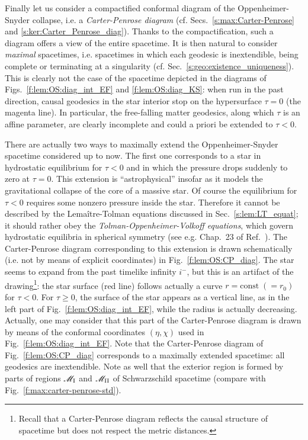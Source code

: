 Finally let us consider a compactified conformal diagram of the Oppenheimer-Snyder collapse, i.e.
a \emph{Carter-Penrose diagram}
(cf. Secs.~\ref{s:max:Carter-Penrose} and \ref{s:ker:Carter_Penrose_diag}).
Thanks to the compactification, such a diagram offers a view of the entire spacetime.
It is then natural to consider \emph{maximal} spacetimes,
i.e. spacetimes in which each geodesic is inextendible, being complete or terminating
at a singularity (cf. Sec.~\ref{s:geo:existence_uniqueness}).
This is clearly not the case of the spacetime depicted in the
diagrams of
Figs.~\ref{f:lem:OS:diag_int_EF} and \ref{f:lem:OS:diag_KS}: when run
in the past direction, causal geodesics
in the star interior stop on the hypersurface $\tau=0$
(the magenta line). In particular, the free-falling matter geodesics, along
which $\tau$ is an affine parameter, are clearly incomplete and could a priori
be extended to
$\tau < 0$.

There are actually two ways to maximally extend the Oppenheimer-Snyder spacetime
considered up to now.
The first one corresponds to a star in
hydrostatic equilibrium for $\tau < 0$ and in which the pressure drops suddenly to zero at $\tau = 0$.
This extension is ``astrophysical'' insofar as it models the gravitational collapse of the core of a massive star. Of course the equilibrium for $\tau< 0$ requires
some nonzero pressure inside the star. Therefore it cannot be described by the
Lemaître-Tolman equations discussed in Sec.~\ref{s:lem:LT_equat}; it should rather
obey the \emph{Tolman-Oppenheimer-Volkoff equations},
which govern hydrostatic equilibria in
spherical symmetry (see e.g. Chap.~23 of Ref.~\cite{MisneTW73}).
The Carter-Penrose diagram corresponding to this extension
is drawn schematically (i.e. not by means of explicit coordinates) in Fig.~\ref{f:lem:OS:CP_diag}. The star seems to expand from
the past timelike infinity $i^-$, but this is an artifact of the drawing\footnote{Recall that a
Carter-Penrose diagram reflects the causal structure of spacetime but does not respect the metric distances.}: the star surface
(red line) follows actually a curve $r = \mathrm{const}\; (= r_0)$ for $\tau < 0$. For $\tau \geq 0$,
the surface of the star appears as a vertical line, as in the left part of Fig.~\ref{f:lem:OS:diag_int_EF}, while the radius is actually
decreasing. Actually, one may consider that this
part of the Carter-Penrose diagram is drawn by means of the conformal coordinates $(\eta,\chi)$ used
in Fig.~\ref{f:lem:OS:diag_int_EF}. Note that the Carter-Penrose diagram of Fig.~\ref{f:lem:OS:CP_diag}
corresponds to a maximally extended spacetime: all geodesics are inextendible.
Note as well that the exterior region is formed by parts of regions $\mathscr{M}_{\rm I}$
and $\mathscr{M}_{\rm II}$ of Schwarzschild spacetime (compare with Fig.~\ref{f:max:carter-penrose-std}).

